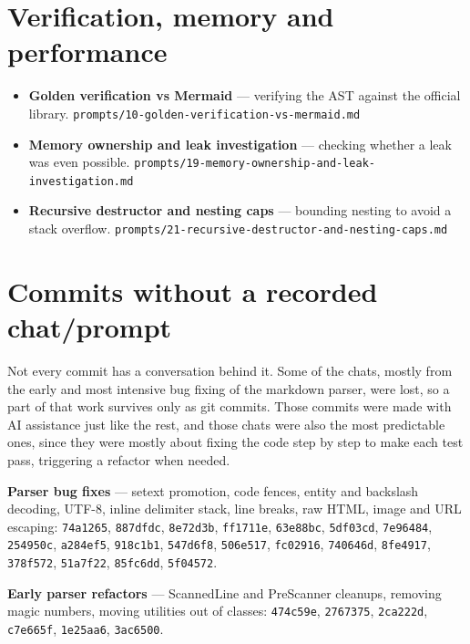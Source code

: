 \documentclass[12pt]{report}
\begin{document}
\section{Verification, memory and performance}

\begin{itemize}
  \item \textbf{Golden verification vs Mermaid} --- verifying the AST against the official library. \texttt{prompts/10-golden-verification-vs-mermaid.md}
  \item \textbf{Memory ownership and leak investigation} --- checking whether a leak was even possible. \texttt{prompts/19-memory-ownership-and-leak-investigation.md}
  \item \textbf{Recursive destructor and nesting caps} --- bounding nesting to avoid a stack overflow. \texttt{prompts/21-recursive-destructor-and-nesting-caps.md}
\end{itemize}

\section{Commits without a recorded chat/prompt}

Not every commit has a conversation behind it. Some of the chats, mostly from the early and most intensive bug fixing of the markdown parser, were lost, so a part of that work survives only as git commits. Those commits were made with AI assistance just like the rest, and those chats were also the most predictable ones, since they were mostly about fixing the code step by step to make each test pass, triggering a refactor when needed.

\textbf{Parser bug fixes} --- setext promotion, code fences, entity and backslash decoding, UTF-8, inline delimiter stack, line breaks, raw HTML, image and URL escaping: \texttt{74a1265}, \texttt{887dfdc}, \texttt{8e72d3b}, \texttt{ff1711e}, \texttt{63e88bc}, \texttt{5df03cd}, \texttt{7e96484}, \texttt{254950c}, \texttt{a284ef5}, \texttt{918c1b1}, \texttt{547d6f8}, \texttt{506e517}, \texttt{fc02916}, \texttt{740646d}, \texttt{8fe4917}, \texttt{378f572}, \texttt{51a7f22}, \texttt{85fc6dd}, \texttt{5f04572}.

\textbf{Early parser refactors} --- ScannedLine and PreScanner cleanups, removing magic numbers, moving utilities out of classes: \texttt{474c59e}, \texttt{2767375}, \texttt{2ca222d}, \texttt{c7e665f}, \texttt{1e25aa6}, \texttt{3ac6500}.
\end{document}
